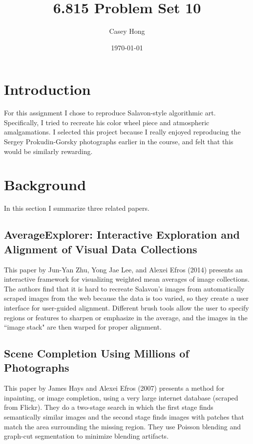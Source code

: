 \documentclass[letterpaper,12pt]{article}
\begin{document}
\title{6.815 Problem Set 10}
\author{Casey Hong}
\date{\today}
\maketitle

\section{Introduction}
For this assignment I chose to reproduce Salavon-style algorithmic art. Specifically, I tried to recreate his color wheel piece and atmospheric amalgamations. I selected this project because I really enjoyed reproducing the Sergey Prokudin-Gorsky photographs earlier in the course, and felt that this would be similarly rewarding.

\section{Background}
In this section I summarize three related papers.

\subsection{AverageExplorer: Interactive Exploration and Alignment of Visual Data Collections}
This paper by Jun-Yan Zhu, Yong Jae Lee, and Alexei Efros (2014) presents an interactive framework for visualizing weighted mean averages of image collections. The authors find that it is hard to recreate Salavon's images from automatically scraped images from the web because the data is too varied, so they create a user interface for user-guided alignment. Different brush tools allow the user to specify regions or features to sharpen or emphasize in the average, and the images in the ``image stack" are then warped for proper alignment.

\subsection{Scene Completion Using Millions of Photographs}
This paper by James Hays and Alexei Efros (2007) presents a method for inpainting, or image completion, using a very large internet database (scraped from Flickr). They do a two-stage search in which the first stage finds semantically similar images and the second stage finds images with patches that match the area surrounding the missing region. They use Poisson blending and graph-cut segmentation to minimize blending artifacts. 
\end{document}
